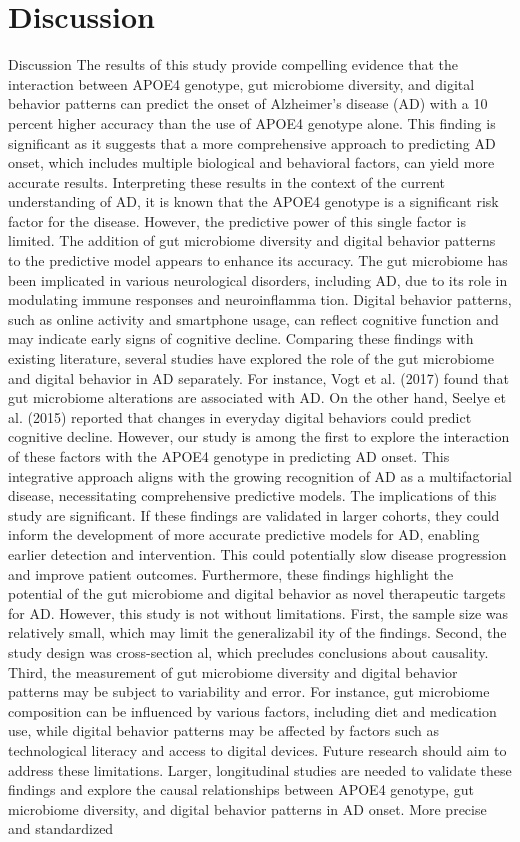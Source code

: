 \documentclass[conference]{IEEEtran}
\begin{document}
\section{Discussion}
Discussion The results of this study provide compelling evidence that the interaction between APOE4 genotype, gut microbiome diversity, and digital behavior patterns can predict the onset of Alzheimer's disease (AD) with a 10 percent higher accuracy than the use of APOE4 genotype alone. This finding is significant as it suggests that a more comprehensive approach to predicting AD onset, which includes multiple biological and behavioral factors, can yield more accurate results. Interpreting these results in the context of the current understanding of AD, it is known that the APOE4 genotype is a significant risk factor for the disease. However, the predictive power of this single factor is limited. The addition of gut microbiome diversity and digital behavior patterns to the predictive model appears to enhance its accuracy. The gut microbiome has been implicated in various neurological disorders, including AD, due to its role in modulating immune responses and neuroinflamma tion. Digital behavior patterns, such as online activity and smartphone usage, can reflect cognitive function and may indicate early signs of cognitive decline. Comparing these findings with existing literature, several studies have explored the role of the gut microbiome and digital behavior in AD separately. For instance, Vogt et al. (2017) found that gut microbiome alterations are associated with AD. On the other hand, Seelye et al. (2015) reported that changes in everyday digital behaviors could predict cognitive decline. However, our study is among the first to explore the interaction of these factors with the APOE4 genotype in predicting AD onset. This integrative approach aligns with the growing recognition of AD as a multifactorial disease, necessitating comprehensive predictive models. The implications of this study are significant. If these findings are validated in larger cohorts, they could inform the development of more accurate predictive models for AD, enabling earlier detection and intervention. This could potentially slow disease progression and improve patient outcomes. Furthermore, these findings highlight the potential of the gut microbiome and digital behavior as novel therapeutic targets for AD. However, this study is not without limitations. First, the sample size was relatively small, which may limit the generalizabil ity of the findings. Second, the study design was cross-section al, which precludes conclusions about causality. Third, the measurement of gut microbiome diversity and digital behavior patterns may be subject to variability and error. For instance, gut microbiome composition can be influenced by various factors, including diet and medication use, while digital behavior patterns may be affected by factors such as technological literacy and access to digital devices. Future research should aim to address these limitations. Larger, longitudinal studies are needed to validate these findings and explore the causal relationships between APOE4 genotype, gut microbiome diversity, and digital behavior patterns in AD onset. More precise and standardized 
\end{document}

